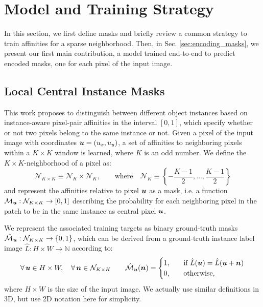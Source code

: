 
\section{Model and Training Strategy}\label{sec:model}
In this section, we first define \maskname masks and briefly review a common strategy to train affinities for a sparse neighborhood.
Then, in Sec. \ref{sec:encoding_masks}, we present our first main contribution, a model trained end-to-end to predict encoded \maskname masks, one for each pixel of the input image. 

\subsection{Local Central Instance Masks}\label{sec:self_masks}
This work proposes to distinguish between different object instances based on instance-aware pixel-pair affinities in the interval $[0,1]$, which specify whether or not two pixels belong to the same instance or not.
Given a pixel of the input image with coordinates $\bm{u}= (u_x, u_y)$, a set of affinities to neighboring pixels within a $K\times K$ window is learned, where $K$ is an odd number. 
We define the $K\times K$-neighborhood of a pixel as:
\begin{equation}
\mathcal{N}_{K\times K} \equiv \mathcal{N}_{K} \times \mathcal{N}_{K}, \qquad \text{where} \quad \mathcal{N}_{K} \equiv \left\{-\frac{K-1}{2}, \ldots, \frac{K-1}{2}\right\}
\end{equation}
and represent the affinities relative to pixel $\bm{u}$ as a \maskname mask, i.e. a function $\mathcal{M}_{\bm{u}}: \mathcal{N}_{K\times K} \rightarrow [0,1]$ describing the probability for each neighboring pixel in the patch to be in the same instance as central pixel $\bm{u}$.

We represent the associated training targets as binary ground-truth masks $\hat{\mathcal{M}}_{\bm{u}}: \mathcal{N}_{K\times K} \rightarrow \{0,1\}$, which can be derived from a ground-truth instance label image $\hat{L}: H\times W \rightarrow \mathbb{N}$ according to:
\begin{equation}\label{eq:target_masks}
\forall\, \bm{u}\in H\times W, \quad \forall\, \bm{n}\in \mathcal{N}_{K\times K} \qquad \hat{\mathcal{M}}_{\bm{u}}(\bm{n}) = 
\begin{cases}
1, \quad &\text{if } \hat{L}(\bm{u}) = \hat{L}(\bm{u}+\bm{n}) \\
0, \quad & \text{otherwise},
\end{cases}
\end{equation}
where $H\times W$ is the size of the input image. We actually use similar definitions in 3D, but use 2D notation here for simplicity.

